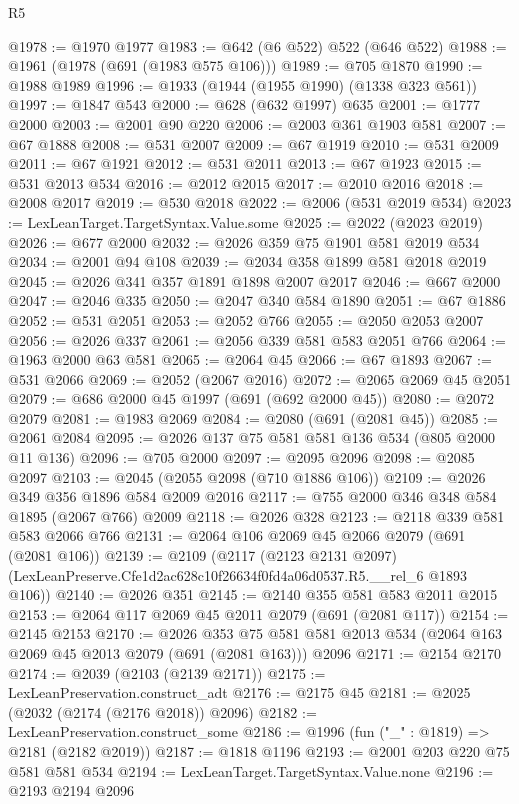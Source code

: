 \begin{lexlean}{R5}
\begin{coremodule}
@1978 := @1970 @1977
@1983 := @642 (@6 @522) @522 (@646 @522)
@1988 := @1961 (@1978 (@691 (@1983 @575 @106)))
@1989 := @705 @1870
@1990 := @1988 @1989
@1996 := @1933 (@1944 (@1955 @1990) (@1338 @323 @561))
@1997 := @1847 @543
@2000 := @628 (@632 @1997) @635
@2001 := @1777 @2000
@2003 := @2001 @90 @220
@2006 := @2003 @361 @1903 @581
@2007 := @67 @1888
@2008 := @531 @2007
@2009 := @67 @1919
@2010 := @531 @2009
@2011 := @67 @1921
@2012 := @531 @2011
@2013 := @67 @1923
@2015 := @531 @2013 @534
@2016 := @2012 @2015
@2017 := @2010 @2016
@2018 := @2008 @2017
@2019 := @530 @2018
@2022 := @2006 (@531 @2019 @534)
@2023 := LexLeanTarget.TargetSyntax.Value.some
@2025 := @2022 (@2023 @2019)
@2026 := @677 @2000
@2032 := @2026 @359 @75 @1901 @581 @2019 @534
@2034 := @2001 @94 @108
@2039 := @2034 @358 @1899 @581 @2018 @2019
@2045 := @2026 @341 @357 @1891 @1898 @2007 @2017
@2046 := @667 @2000
@2047 := @2046 @335
@2050 := @2047 @340 @584 @1890
@2051 := @67 @1886
@2052 := @531 @2051
@2053 := @2052 @766
@2055 := @2050 @2053 @2007
@2056 := @2026 @337
@2061 := @2056 @339 @581 @583 @2051 @766
@2064 := @1963 @2000 @63 @581
@2065 := @2064 @45
@2066 := @67 @1893
@2067 := @531 @2066
@2069 := @2052 (@2067 @2016)
@2072 := @2065 @2069 @45 @2051
@2079 := @686 @2000 @45 @1997 (@691 (@692 @2000 @45))
@2080 := @2072 @2079
@2081 := @1983 @2069
@2084 := @2080 (@691 (@2081 @45))
@2085 := @2061 @2084
@2095 := @2026 @137 @75 @581 @581 @136 @534 (@805 @2000 @11 @136)
@2096 := @705 @2000
@2097 := @2095 @2096
@2098 := @2085 @2097
@2103 := @2045 (@2055 @2098 (@710 @1886 @106))
@2109 := @2026 @349 @356 @1896 @584 @2009 @2016
@2117 := @755 @2000 @346 @348 @584 @1895 (@2067 @766) @2009
@2118 := @2026 @328
@2123 := @2118 @339 @581 @583 @2066 @766
@2131 := @2064 @106 @2069 @45 @2066 @2079 (@691 (@2081 @106))
@2139 := @2109
    (@2117
      (@2123 @2131 @2097)
      (LexLeanPreserve.Cfe1d2ac628c10f26634f0fd4a06d0537.R5.__rel_6 @1893 @106))
@2140 := @2026 @351
@2145 := @2140 @355 @581 @583 @2011 @2015
@2153 := @2064 @117 @2069 @45 @2011 @2079 (@691 (@2081 @117))
@2154 := @2145 @2153
@2170 := @2026
    @353
    @75
    @581
    @581
    @2013
    @534
    (@2064 @163 @2069 @45 @2013 @2079 (@691 (@2081 @163)))
    @2096
@2171 := @2154 @2170
@2174 := @2039 (@2103 (@2139 @2171))
@2175 := LexLeanPreservation.construct_adt
@2176 := @2175 @45
@2181 := @2025 (@2032 (@2174 (@2176 @2018)) @2096)
@2182 := LexLeanPreservation.construct_some
@2186 := @1996 (fun ("_" : @1819) => @2181 (@2182 @2019))
@2187 := @1818 @1196
@2193 := @2001 @203 @220 @75 @581 @581 @534
@2194 := LexLeanTarget.TargetSyntax.Value.none
@2196 := @2193 @2194 @2096

\end{coremodule}
\end{lexlean}
